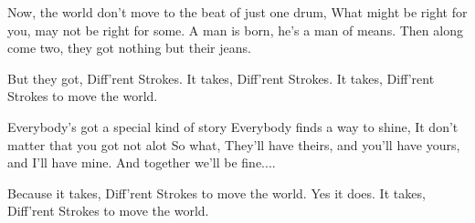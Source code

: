 Now, the world don't move to the beat of just one drum, 
What might be right for you, may not be right for some. 
A man is born, he's a man of means. 
Then along come two, they got nothing but their jeans. 

But they got, Diff'rent Strokes. 
It takes, Diff'rent Strokes. 
It takes, Diff'rent Strokes to move the world. 

Everybody's got a special kind of story 
Everybody finds a way to shine, 
It don't matter that you got not alot 
So what, 
They'll have theirs, and you'll have yours, and I'll have mine. 
And together we'll be fine.... 

Because it takes, Diff'rent Strokes to move the world. 
Yes it does. 
It takes, Diff'rent Strokes to move the world. 
